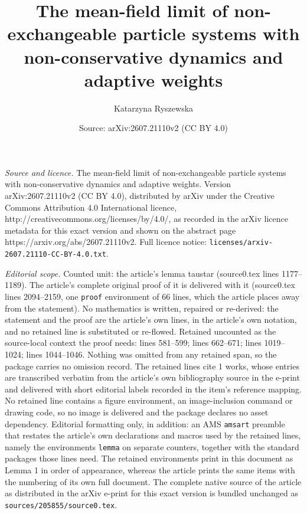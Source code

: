 \documentclass[10pt,a4paper]{amsart}
\title{The mean-field limit of non-exchangeable particle systems with non-conservative dynamics and adaptive weights}
\author{Katarzyna Ryszewska}
\date{Source: arXiv:2607.21110v2 (CC BY 4.0)}
\begin{document}
\maketitle

\noindent\emph{Source and licence.} The mean-field limit of non-exchangeable particle systems with non-conservative dynamics and adaptive weights. Version arXiv:2607.21110v2 (CC BY 4.0), distributed by arXiv under the Creative Commons Attribution 4.0 International licence, http://creativecommons.org/licenses/by/4.0/, as recorded in the arXiv licence metadata for this exact version and shown on the abstract page https://arxiv.org/abs/2607.21110v2. Full licence notice: \texttt{licenses/arxiv-2607.21110-CC-BY-4.0.txt}.\par\smallskip

\noindent\textit{Editorial scope.} Counted unit: the article's lemma taustar (source0.tex lines 1177--1189). The article's complete original proof of it is delivered with it (source0.tex lines 2094--2159, one \texttt{proof} environment of 66 lines, which the article places away from the statement). No mathematics is written, repaired or re-derived: the statement and the proof are the article's own lines, in the article's own notation, and no retained line is substituted or re-flowed.  Retained uncounted as the source-local context the proof needs: lines 581--599; lines 662--671; lines 1019--1024; lines 1044--1046.  Nothing was omitted from any retained span, so the package carries no omission record.  The retained lines cite 1 works, whose entries are transcribed verbatim from the article's own bibliography source in the e-print and delivered with short editorial labels recorded in the item's reference mapping.  No retained line contains a figure environment, an image-inclusion command or drawing code, so no image is delivered and the package declares no asset dependency.  Editorial formatting only, in addition: an AMS \texttt{amsart} preamble that restates the article's own declarations and macros used by the retained lines, namely the environments \texttt{lemma} on separate counters, together with the standard packages those lines need.  The retained environments print in this document as Lemma 1 in order of appearance, whereas the article prints the same items with the numbering of its own full document.  The complete native source of the article as distributed in the arXiv e-print for this exact version is bundled unchanged as \texttt{sources/205855/source0.tex}.
\end{document}

